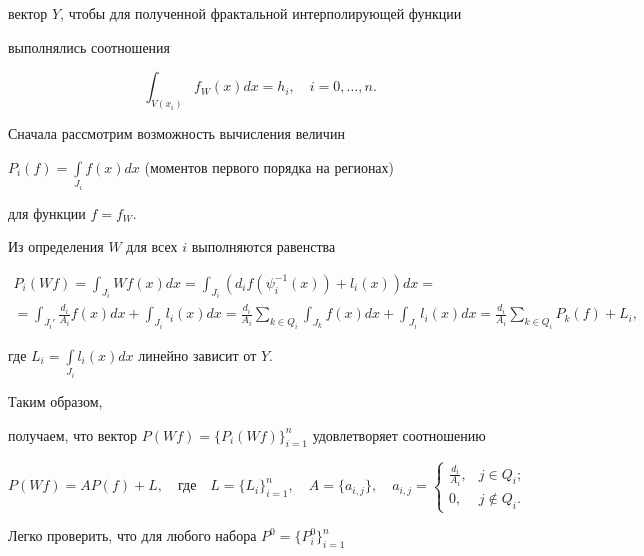 вектор $ Y $, чтобы для полученной фрактальной интерполирующей функции


выполнялись соотношения


\begin{equation} \label{intavr}


\int_{V(x_i)} f_W (x) dx = h_i, \quad i=0,\dotsc,n.


\end{equation}





Сначала рассмотрим возможность вычисления величин


$P_i(f) = \int\limits_{J_i} f(x)dx$ (моментов первого порядка на регионах)


для функции $f = f_W$.


Из определения $W$ для всех $i$ выполняются равенства


\begin{multline*}


P_i(Wf) = \int_{J_i} Wf(x)dx =


\int_{J_i} \left(d_i f(\psi_i^{-1}(x)) + l_i(x) \right) dx = \\


%


= \int_{J_i'} \frac{d_i}{A_i} f(x) dx+ \int_{J_i}l_i(x)dx =


\frac{d_i}{ A_i } \sum_{k\in Q_i} \int_{J_k} f(x) dx+ \int_{J_i} l_i(x)dx =


\frac{ d_i}{ A_i} \sum_{k\in Q_i} P_k(f) + L_i ,


\end{multline*}


где $L_i=\int\limits_{J_i} l_i(x)dx $ линейно зависит от $Y$.


Таким образом,


получаем, что вектор $P(Wf)=\{P_i(Wf)\}_{i=1}^n $ удовлетворяет соотношению


$$ P(Wf) = AP(f)+L,


\quad \text{где} \quad


L=\{L_i\}_{i=1}^n, \quad A=\{a_{i,j}\},\quad


a_{i,j}=\begin{cases}


\frac{d_i}{A_i}, & {j \in Q_i};\\ 0, & j \notin Q_i. \end{cases}


$$


Легко проверить, что для любого набора $ P^0 = \{P_i^0\}_{i=1}^n$


